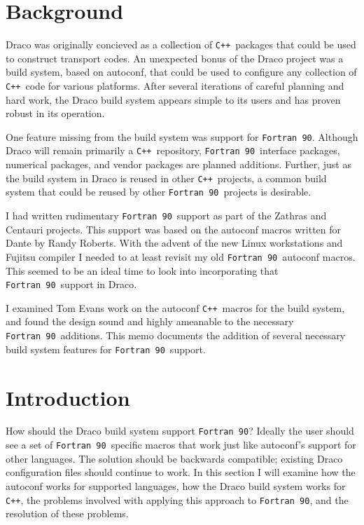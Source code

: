 \documentclass[11pt]{nmemo}
\newcommand{\fninety}{\texttt{Fortran~90}}
\newcommand{\cpp}{\texttt{C++}}
\begin{document}
\section{Background}

Draco was originally concieved as a collection of \cpp\ packages that
could be used to construct transport codes.  An unexpected bonus of
the Draco project was a build system, based on autoconf, that could be
used to configure any collection of \cpp\ code for various platforms.
After several iterations of careful planning and hard work, the Draco
build system appears simple to its users and has proven robust in its
operation.

One feature missing from the build system was support for \fninety.
Although Draco will remain primarily a \cpp\ repository, \fninety\
interface packages, numerical packages, and vendor packages are
planned additions.  Further, just as the build system in Draco is
reused in other \cpp\ projects, a common build system that could be
reused by other \fninety\ projects is desirable.

I had written rudimentary \fninety\ support as part of the Zathras and
Centauri projects.  This support was based on the autoconf macros
written for Dante by Randy Roberts.  With the advent of the new Linux
workstations and Fujitsu compiler I needed to at least revisit my old
\fninety\ autoconf macros.  This seemed to be an ideal time to look
into incorporating that \fninety\ support in Draco.

I examined Tom Evans work on the autoconf \cpp\ macros for the build
system, and found the design sound and highly ameanable to the
necessary \fninety\ additions.  This memo documents the addition of
several necessary build system features for \fninety\ support.

\newpage

\section{Introduction}

How should the Draco build system support \fninety?  Ideally the user
should see a set of \fninety\ specific macros that work just like
autoconf's support for other languages.  The solution should be
backwards compatible; existing Draco configuration files should
continue to work.  In this section I will examine how the autoconf
works for supported languages, how the Draco build system works for
\cpp, the problems involved with applying this approach to \fninety,
and the resolution of these problems.
\end{document}
